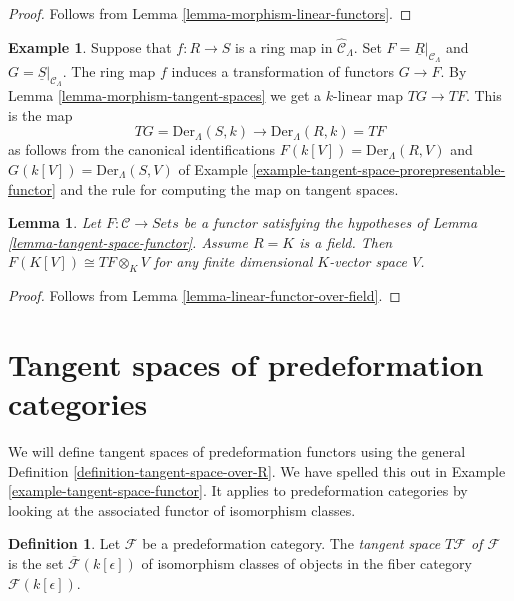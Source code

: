 \documentclass{stacks-project}
\theoremstyle{plain}
\newtheorem{lemma}[subsection]{Lemma}
\theoremstyle{definition}
\newtheorem{definition}[subsection]{Definition}
\newtheorem{example}[subsection]{Example}
\theoremstyle{remark}
\numberwithin{equation}{subsection}
\begin{document}
\begin{proof}
Follows from
Lemma \ref{lemma-morphism-linear-functors}.
\end{proof}

\begin{example}
\label{example-tangent-space-map-prorepresentable-functor}
Suppose that $f : R \to S$ is a ring map in $\widehat{\mathcal{C}}_\Lambda$.
Set $F = \underline{R}|_{\mathcal{C}_\Lambda}$ and
$G = \underline{S}|_{\mathcal{C}_\Lambda}$. The ring map
$f$ induces a transformation of functors $G \to F$. By
Lemma \ref{lemma-morphism-tangent-spaces}
we get a $k$-linear map $TG \to TF$. This is the map
$$
TG = \text{Der}_\Lambda(S, k) \longrightarrow \text{Der}_\Lambda(R, k) = TF
$$
as follows from the canonical identifications
$F(k[V]) = \text{Der}_\Lambda(R, V)$ and
$G(k[V]) = \text{Der}_\Lambda(S, V)$ of
Example \ref{example-tangent-space-prorepresentable-functor}
and the rule for computing the map on tangent spaces.
\end{example}

\begin{lemma}
\label{lemma-tangent-space-tensor}
Let $F: \mathcal{C} \to \textit{Sets}$ be a functor satisfying the
hypotheses of
Lemma \ref{lemma-tangent-space-functor}.
Assume $R = K$ is a field. Then $F(K[V]) \cong TF \otimes_K V$
for any finite dimensional $K$-vector space $V$.
\end{lemma}

\begin{proof}
Follows from
Lemma \ref{lemma-linear-functor-over-field}.
\end{proof}






\section{Tangent spaces of predeformation categories}
\label{section-tangent-spaces}

\noindent
We will define tangent spaces of predeformation functors using the general
Definition \ref{definition-tangent-space-over-R}.
We have spelled this out in
Example \ref{example-tangent-space-functor}.
It applies to predeformation categories by looking at the associated
functor of isomorphism classes.

\begin{definition}
\label{definition-tangent-space}
Let $\mathcal{F}$ be a predeformation category.
The {\it tangent space $T \mathcal{F}$ of $\mathcal{F}$}
is the set $\overline{\mathcal{F}}(k[\epsilon])$
of isomorphism classes of objects in the fiber category $\mathcal
F(k[\epsilon])$.
\end{definition}
\end{document}
